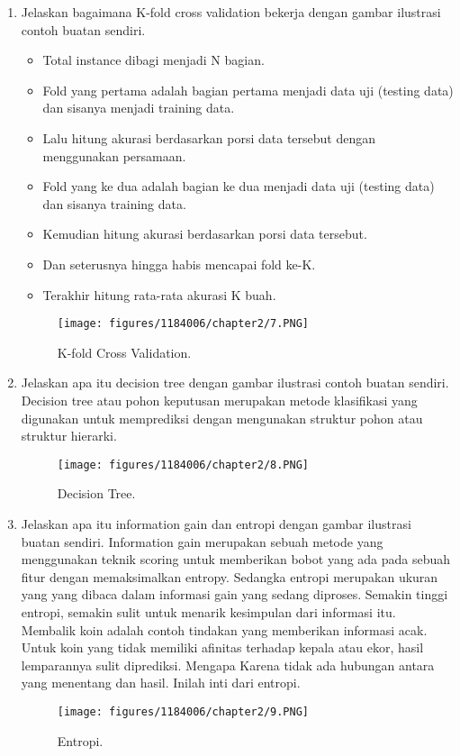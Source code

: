 \begin{enumerate}
	\item Jelaskan bagaimana K-fold cross validation bekerja dengan gambar ilustrasi contoh buatan sendiri.
	\hfill\break
	\begin{itemize}
	\item Total instance dibagi menjadi N bagian.
	\item Fold yang pertama adalah bagian pertama menjadi data uji (testing data) dan sisanya menjadi training data.
	\item Lalu hitung akurasi berdasarkan porsi data tersebut dengan menggunakan persamaan.
	\item Fold yang ke dua adalah bagian ke dua menjadi data uji (testing data) dan sisanya training data. 
	\item Kemudian hitung akurasi berdasarkan porsi data tersebut.
	\item Dan seterusnya hingga habis mencapai fold ke-K.
	\item Terakhir hitung rata-rata akurasi K buah.
	\end{itemize}

	\begin{figure}[h]
	\centering
		\texttt{[image: figures/1184006/chapter2/7.PNG]}
		\caption{K-fold Cross Validation.}
	\end{figure}

	\item Jelaskan apa itu decision tree dengan gambar ilustrasi contoh buatan sendiri.
	\hfill\break
	Decision tree atau pohon keputusan merupakan metode klasifikasi yang digunakan untuk memprediksi dengan mengunakan struktur pohon atau struktur hierarki.

	\begin{figure}[h]
	\centering
		\texttt{[image: figures/1184006/chapter2/8.PNG]}
		\caption{Decision Tree.}
	\end{figure}

	\item Jelaskan apa itu information gain dan entropi dengan gambar ilustrasi buatan sendiri.
	\hfill\break
	Information gain merupakan sebuah metode yang menggunakan teknik scoring untuk memberikan bobot yang ada  pada sebuah fitur dengan memaksimalkan entropy. Sedangka entropi merupakan  ukuran yang yang dibaca dalam informasi gain yang sedang diproses. Semakin tinggi entropi, semakin sulit untuk menarik kesimpulan dari informasi itu. Membalik koin adalah contoh tindakan yang memberikan informasi acak. Untuk koin yang tidak memiliki afinitas terhadap kepala atau ekor, hasil lemparannya sulit diprediksi. Mengapa Karena tidak ada hubungan antara yang menentang dan hasil. Inilah inti dari entropi.
	\begin{figure}[h]
	\centering
		\texttt{[image: figures/1184006/chapter2/9.PNG]}
		\caption{Entropi.}
	\end{figure}


\end{enumerate}


